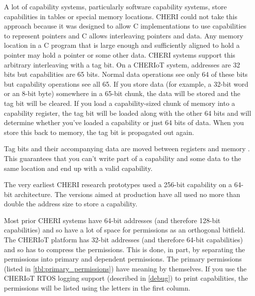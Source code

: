 A lot of capability systems, particularly software capability systems, store capabilities in tables or special memory locations.
CHERI could not take this approach because it was designed to allow C implementations to use capabilities to represent pointers and C allows interleaving pointers and data.
Any memory location in a C program that is large enough and sufficiently aligned to hold a pointer may hold a pointer or some other data.
CHERI systems support this arbitrary interleaving with a tag bit.
On a CHERIoT system, addresses are 32 bits but capabilities are 65 bits.
Normal data operations see only 64 of these bits but capability operations see all 65.
If you store data (for example, a 32-bit word or an 8-bit byte) somewhere in a 65-bit chunk, the data will be stored and the tag bit will be cleared.
If you load a capability-sized chunk of memory into a capability register, the tag bit will be loaded along with the other 64 bits and will determine whether you've loaded a capability or just 64 bits of data.
When you store this back to memory, the tag bit is propagated out again.

Tag bits and their accompanying data are moved between registers and memory .
This guarantees that you can't write part of a capability and some data to the same location and end up with a valid capability.



\begin{note}
The very earliest CHERI research prototypes used a 256-bit capability on a 64-bit architecture.
The versions aimed at production have all used no more than double the address size to store a capability.
\end{note}

Most prior CHERI systems have 64-bit addresses (and therefore 128-bit capabilities) and so have a lot of space for permissions as an orthogonal bitfield.
The CHERIoT platform has 32-bit addresses (and therefore 64-bit capabilities) and so has to compress the permissions.
This is done, in part, by separating the permissions into primary and dependent permissions.
The primary permissions (listed in \ref{tbl:primary_permissions}) have meaning by themselves.
If you use the CHERIoT RTOS logging support (described in \ref{debug}) to print capabilities, the permissions will be listed using the letters in the first column.

